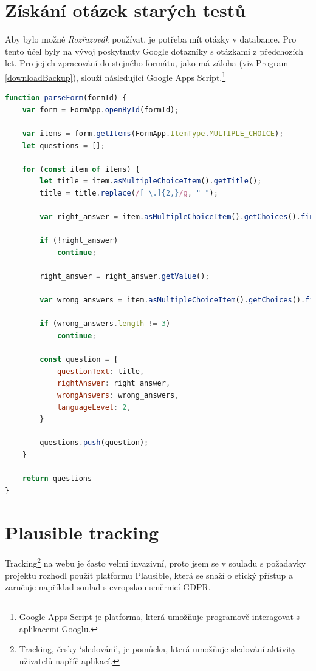 \pagebreak
\section{Získání otázek starých testů}

Aby bylo možné \emph{Rozřazovák} používat, je potřeba mít otázky v databance. Pro tento účel byly na vývoj poskytnuty Google dotazníky s otázkami z předchozích let. Pro jejich zpracování do stejného formátu, jako má záloha (viz Program \ref{downloadBackup}), slouží následující Google Apps Script.\footnote{Google Apps Script je platforma, která umožňuje programově interagovat s aplikacemi Googlu.}

\begin{lstlisting}[language=JavaScript,caption={Úryvek z \M{/scripts/parse\_forms.js}; zpracování dat Google dotazníku.}, label={xslxgen}]
function parseForm(formId) {
    var form = FormApp.openById(formId);

    var items = form.getItems(FormApp.ItemType.MULTIPLE_CHOICE);
    let questions = [];
    
    for (const item of items) {
        let title = item.asMultipleChoiceItem().getTitle();
        title = title.replace(/[_\.]{2,}/g, "_");

        var right_answer = item.asMultipleChoiceItem().getChoices().find(x => x.isCorrectAnswer());

        if (!right_answer)
            continue;

        right_answer = right_answer.getValue();

        var wrong_answers = item.asMultipleChoiceItem().getChoices().filter(x => !x.isCorrectAnswer()).map(x => x.getValue());

        if (wrong_answers.length != 3)
            continue;

        const question = {
            questionText: title,
            rightAnswer: right_answer,
            wrongAnswers: wrong_answers,
            languageLevel: 2,
        }

        questions.push(question);
    }

    return questions
}
\end{lstlisting}

\section{Plausible tracking}

Tracking\footnote{Tracking, česky \enquote*{sledování}, je pomůcka, která umožňuje sledování aktivity uživatelů napříč aplikací.} na webu je často velmi invazivní, proto jsem se v souladu s požadavky projektu rozhodl použít platformu Plausible, která se snaží o etický přístup a zaručuje například soulad s evropskou směrnicí GDPR.\cite{plausible}

